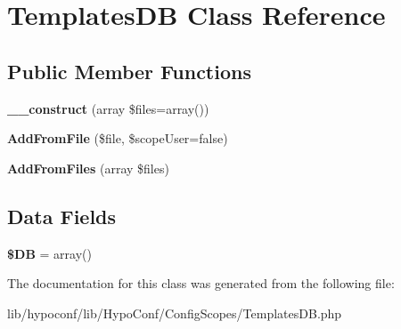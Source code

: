 \hypertarget{class_hypo_conf_1_1_config_scopes_1_1_templates_d_b}{
\section{\-Templates\-D\-B \-Class \-Reference}
\label{class_hypo_conf_1_1_config_scopes_1_1_templates_d_b}
}
\subsection*{\-Public \-Member \-Functions}
\begin{DoxyCompactItemize}
\item 
\hypertarget{class_hypo_conf_1_1_config_scopes_1_1_templates_d_b_ad9846823237da230c8a8af6dc380dbba}{
{\bfseries \-\_\-\-\_\-construct} (array \$files=array())}
\label{class_hypo_conf_1_1_config_scopes_1_1_templates_d_b_ad9846823237da230c8a8af6dc380dbba}

\item 
\hypertarget{class_hypo_conf_1_1_config_scopes_1_1_templates_d_b_afc26bbbee4e7c1bc52bdd9ce8324ada3}{
{\bfseries \-Add\-From\-File} (\$file, \$scope\-User=false)}
\label{class_hypo_conf_1_1_config_scopes_1_1_templates_d_b_afc26bbbee4e7c1bc52bdd9ce8324ada3}

\item 
\hypertarget{class_hypo_conf_1_1_config_scopes_1_1_templates_d_b_a5bf1f3c9e4c6d8d55f9ff122383bff5e}{
{\bfseries \-Add\-From\-Files} (array \$files)}
\label{class_hypo_conf_1_1_config_scopes_1_1_templates_d_b_a5bf1f3c9e4c6d8d55f9ff122383bff5e}

\end{DoxyCompactItemize}
\subsection*{\-Data \-Fields}
\begin{DoxyCompactItemize}
\item 
\hypertarget{class_hypo_conf_1_1_config_scopes_1_1_templates_d_b_a7dc56dc8b18ad37272b56fa7395bedef}{
{\bfseries \$\-D\-B} = array()}
\label{class_hypo_conf_1_1_config_scopes_1_1_templates_d_b_a7dc56dc8b18ad37272b56fa7395bedef}

\end{DoxyCompactItemize}


\-The documentation for this class was generated from the following file\-:\begin{DoxyCompactItemize}
\item 
lib/hypoconf/lib/\-Hypo\-Conf/\-Config\-Scopes/\-Templates\-D\-B.\-php\end{DoxyCompactItemize}
